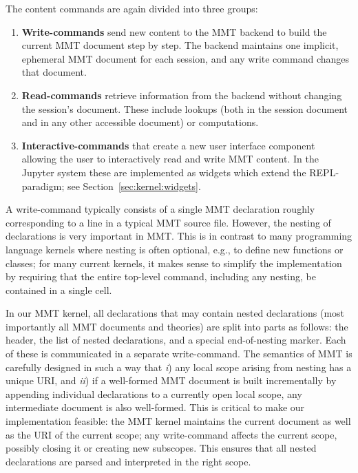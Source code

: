The content commands are again divided into three groups:
\begin{enumerate}
 \item \textbf{Write-commands} send new content to the MMT backend to build the current MMT document step by step.
   The backend maintains one implicit, ephemeral MMT document for each session, and any write command changes that document.
 \item \textbf{Read-commands} retrieve information from the backend without changing the session's document.
   These include lookups (both in the session document and in any other accessible document) or computations.
  \item \textbf{Interactive-commands} that create a new user interface component allowing the user to interactively read and write MMT content. 
   In the Jupyter system these are implemented as widgets which extend the REPL-paradigm; see Section~\ref{sec:kernel:widgets}. 
\end{enumerate}

A write-command typically consists of a single MMT declaration roughly corresponding to a line in a typical MMT source file.
However, the nesting of declarations is very important in MMT.
This is in contrast to many programming language kernels where nesting is often optional, e.g., to define new functions or classes;
for many current kernels, it makes sense to simplify the implementation by requiring that the entire top-level command, including any nesting, be contained in a single cell.

In our MMT kernel, all declarations that may contain nested declarations (most importantly all MMT documents and theories) are split into parts as follows: the header, the list of nested declarations, and a special end-of-nesting marker.
Each of these is communicated in a separate write-command.
The semantics of MMT is carefully designed in such a way that \emph{i}) any local scope arising from nesting has a unique URI, and \emph{ii}) if a well-formed MMT document is built incrementally by appending individual declarations to a currently open local scope, any intermediate document is also well-formed.
This is critical to make our implementation feasible: the MMT kernel maintains the current document as well as the URI of the current scope; any write-command affects the current scope, possibly closing it or creating new subscopes.
This ensures that all nested declarations are parsed and interpreted in the right scope.

